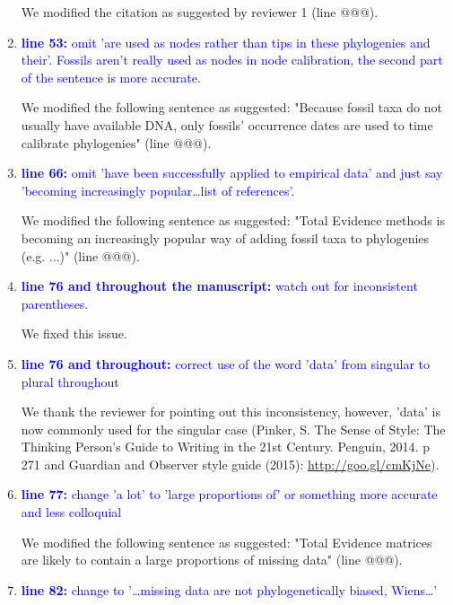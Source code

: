 \documentclass[12pt,letterpaper]{article}
\begin{document}
\begin{enumerate}
We modified the citation as suggested by reviewer 1 (line @@@).

\item{\textcolor{blue}{\textbf{line 53:} omit 'are used as nodes rather than tips in these phylogenies and their'. Fossils aren't really used as nodes in node calibration, the second part of the sentence is more accurate.}}

We modified the following sentence as suggested: "Because fossil taxa do not usually have available DNA, only fossils' occurrence dates are used to time calibrate phylogenies" (line @@@).

\item{\textcolor{blue}{\textbf{line 66:} omit 'have been successfully applied to empirical data' and just say 'becoming increasingly popular…list of references'. }}

We modified the following sentence as suggested: "Total Evidence methods is becoming an increasingly popular way of adding fossil taxa to phylogenies (e.g. ...)" (line @@@).

\item{\textcolor{blue}{\textbf{line 76 and throughout the manuscript:} watch out for inconsistent parentheses.}}

We fixed this issue.

\item{\textcolor{blue}{\textbf{line 76 and throughout:} correct use of the word 'data' from singular to plural throughout}}

We thank the reviewer for pointing out this inconsistency, however, 'data' is now commonly used for the singular case (Pinker, S. The Sense of Style: The Thinking Person's Guide to Writing in the 21st Century. Penguin, 2014. p 271 and Guardian and Observer style guide (2015): \url{http://goo.gl/cmKjNe}).

\item{\textcolor{blue}{\textbf{line 77:} change 'a lot' to 'large proportions of' or something more accurate and less colloquial}}

We modified the following sentence as suggested: "Total Evidence matrices are likely to contain a large proportions of missing data" (line @@@).

\item{\textcolor{blue}{\textbf{line 82:} change to '…missing data are not phylogenetically biased, Wiens…'}}


\end{enumerate}
\end{document}
